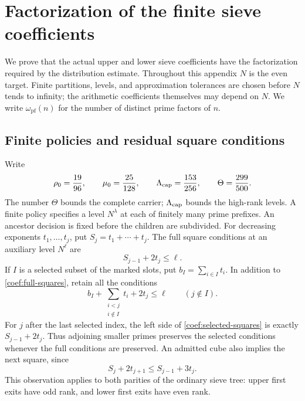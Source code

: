 \section{Factorization of the finite sieve coefficients}
\label{app:coefficients}

We prove that the actual upper and lower sieve coefficients have
the factorization required by the distribution estimate. Throughout
this appendix $N$ is the even target. Finite partitions, levels,
and approximation tolerances are chosen before $N$ tends to
infinity; the arithmetic coefficients themselves may depend on $N$.
We write $\omega_{\mathrm{pf}}(n)$ for the number of distinct prime
factors of $n$.

\subsection{Finite policies and residual square conditions}

Write
\[
 \rho_0=\frac{19}{96},\qquad \mu_0=\frac{25}{128},\qquad
 \Lambda_{\rm cap}=\frac{153}{256},\qquad \Theta=\frac{299}{500}.
\]
The number $\Theta$ bounds the complete carrier; $\Lambda_{\rm cap}$ bounds the
high-rank levels.  A finite policy specifies a level $N^\lambda$ at each
of finitely many prime prefixes.  An ancestor decision is fixed before
the children are subdivided.  For decreasing exponents $t_1,\ldots,t_j$,
put $S_j=t_1+\cdots+t_j$.  The full square conditions at an auxiliary
level $N^\ell$ are
\begin{equation}
 S_{j-1}+2t_j\le\ell.
 \label{coef:full-squares}
\end{equation}
If $I$ is a selected subset of the marked slots, put
$b_I=\sum_{i\in I}t_i$.  In addition to \eqref{coef:full-squares}, retain
all the conditions
\begin{equation}
 b_I+\sum_{\substack{i<j\\i\notin I}}t_i+2t_j\le\ell
 \qquad(j\notin I).
 \label{coef:selected-squares}
\end{equation}
For $j$ after the last selected index, the left side of
\eqref{coef:selected-squares} is exactly $S_{j-1}+2t_j$.
Thus adjoining smaller primes preserves the selected conditions whenever
the full conditions are preserved.  An admitted cube also implies the
next square, since
\[
 S_j+2t_{j+1}\le S_{j-1}+3t_j.
\]
This observation applies to both parities of the ordinary sieve tree:
upper first exits have odd rank, and lower first exits have even rank.

